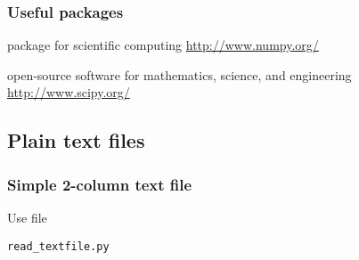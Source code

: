 \begin{frame}
\frametitle{Useful packages}

\begin{description}
\item<1->[NumPy:] package for scientific computing \url{http://www.numpy.org/}
\item<2->[SciPy:] open-source software for mathematics, science, and engineering \url{http://www.scipy.org/}

\end{description}
\end{frame}

\subsection{Plain text files}
\begin{frame}[fragile]
\frametitle{Simple 2-column text file}
Use file 


\exercise \verb|read_textfile.py|  
\end{frame}


